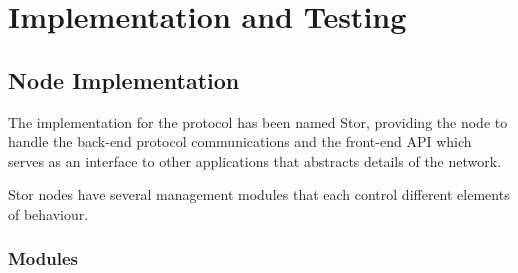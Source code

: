 \section{Implementation and Testing}
	\subsection{Node Implementation}
		The implementation for the protocol has been named Stor, providing the node to handle the back-end protocol communications and the front-end API which serves as an interface to other applications that abstracts details of the network.
		
		Stor nodes have several management modules that each control different elements of behaviour.
		\subsubsection*{Modules}
		
